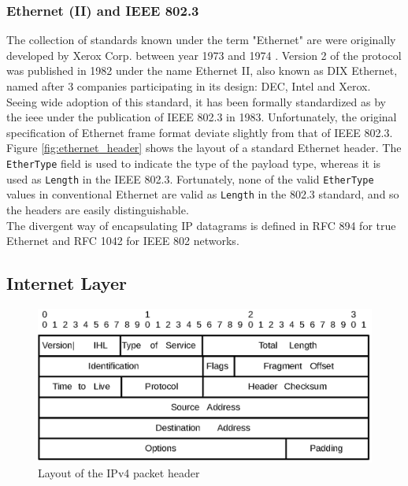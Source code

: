 \subsubsection{Ethernet (II) and IEEE 802.3}
The collection of standards known under the term "Ethernet" are were originally
developed by Xerox Corp. between year 1973 and 1974\cite{americanhistory_ethernet}
\cite{tcpip_illustrated_vol1}. Version 2 of the protocol was published in 1982
under the name Ethernet II, also known as DIX Ethernet, named after 3 companies
participating in its design: DEC, Intel and Xerox\cite{heywood2001drew}.\\
Seeing wide adoption of this standard, it has been formally standardized as by
the \gls{ieee} under the publication of IEEE 802.3 in
1983\cite{ieee_8023_release}. Unfortunately, the original specification of
Ethernet frame format deviate slightly from that of IEEE
802.3\cite{tcpip_illustrated_vol1}. Figure \ref{fig:ethernet_header} shows the
layout of a standard Ethernet header. The \texttt{EtherType} field is used to
indicate the type of the payload type, whereas it is used as \texttt{Length} in
the IEEE 802.3. Fortunately, none of the valid \texttt{EtherType} values in
conventional Ethernet are valid as \texttt{Length} in the 802.3 standard, and
so the headers are easily distinguishable.\\
The divergent way of encapsulating IP datagrams is defined in RFC 894 for
true Ethernet\cite{RFC0894} and RFC 1042 for IEEE 802 networks\cite{RFC1042}.



\subsection{Internet Layer}
\begin{figure}
\includegraphics[width=\linewidth]{background/ip.eps}
\caption{Layout of the IPv4 packet header}
\label{fig:ipv4_header}
\end{figure}

